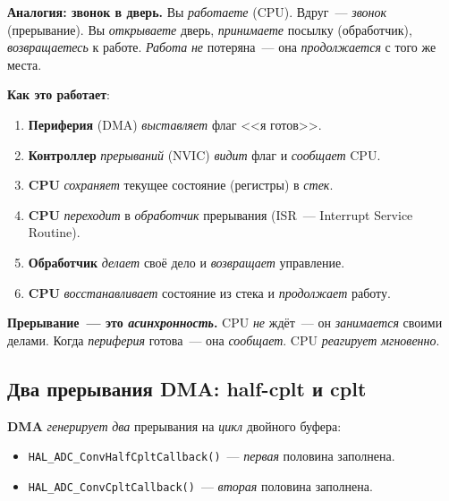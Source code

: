 \begin{ideabox}
\textbf{Аналогия: звонок в дверь.} Вы \emph{работаете}
(CPU). Вдруг~--- \emph{звонок} (прерывание). Вы
\emph{открываете} дверь, \emph{принимаете} посылку
(обработчик), \emph{возвращаетесь} к работе. \emph{Работа}
\emph{не} потеряна~--- она \emph{продолжается} с того
же места.
\end{ideabox}

\textbf{Как это работает}:
\begin{enumerate}
    \item \textbf{Периферия} (DMA) \emph{выставляет} флаг
          <<я готов>>.
    \item \textbf{Контроллер} \emph{прерываний} (NVIC)
          \emph{видит} флаг и \emph{сообщает} CPU.
    \item \textbf{CPU} \emph{сохраняет} текущее состояние
          (регистры) в \emph{стек}.
    \item \textbf{CPU} \emph{переходит} в \emph{обработчик}
          прерывания (ISR~--- Interrupt Service Routine).
    \item \textbf{Обработчик} \emph{делает} своё дело
          и \emph{возвращает} управление.
    \item \textbf{CPU} \emph{восстанавливает} состояние
          из стека и \emph{продолжает} работу.
\end{enumerate}

\begin{keybox}
\textbf{Прерывание~--- это \emph{асинхронность}.} CPU
\emph{не} ждёт~--- он \emph{занимается} своими делами.
Когда \emph{периферия} готова~--- она \emph{сообщает}.
CPU \emph{реагирует} \emph{мгновенно}.
\end{keybox}

\subsection{Два прерывания DMA: half-cplt и cplt}

\textbf{DMA} \emph{генерирует} \emph{два} прерывания на
\emph{цикл} двойного буфера:

\begin{itemize}
    \item \texttt{HAL\_ADC\_ConvHalfCpltCallback()}~---
          \emph{первая} половина заполнена.
    \item \texttt{HAL\_ADC\_ConvCpltCallback()}~---
          \emph{вторая} половина заполнена.
\end{itemize}

